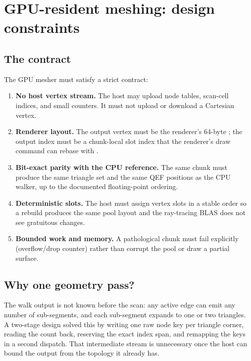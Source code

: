 \section{GPU-resident meshing: design constraints}
\label{sec:gpudesign}

\subsection{The contract}

The GPU mesher must satisfy a strict contract:
\begin{enumerate}[label=\textbf{G\arabic*.},leftmargin=2.2em]
\item \textbf{No host vertex stream.}  The host may upload node tables,
  scan-cell indices, and small counters.  It must not upload or download a
  Cartesian vertex.
\item \textbf{Renderer layout.}  The output vertex must be the renderer's
  64-byte ; the output index must be a chunk-local slot index
  that the renderer's draw command can rebase with .
\item \textbf{Bit-exact parity with the CPU reference.}  The same chunk
  must produce the same triangle set and the same QEF positions as the CPU
  walker, up to the documented floating-point ordering.
\item \textbf{Deterministic slots.}  The host must assign vertex slots in a
  stable order so a rebuild produces the same pool layout and the
  ray-tracing BLAS does not see gratuitous changes.
\item \textbf{Bounded work and memory.}  A pathological chunk must fail
  explicitly (overflow/drop counter) rather than corrupt the pool or draw a
  partial surface.
\end{enumerate}

\subsection{Why one geometry pass?}

The walk output is not known before the scan: any active edge can emit any
number of sub-segments, and each sub-segment expands to one or two
triangles.  A two-stage design solved this by writing one raw node key per
triangle corner, reading the count back, reserving the exact index span,
and remapping the keys in a second dispatch.  That intermediate stream is
unnecessary once the host can bound the output from the topology it already
has.

